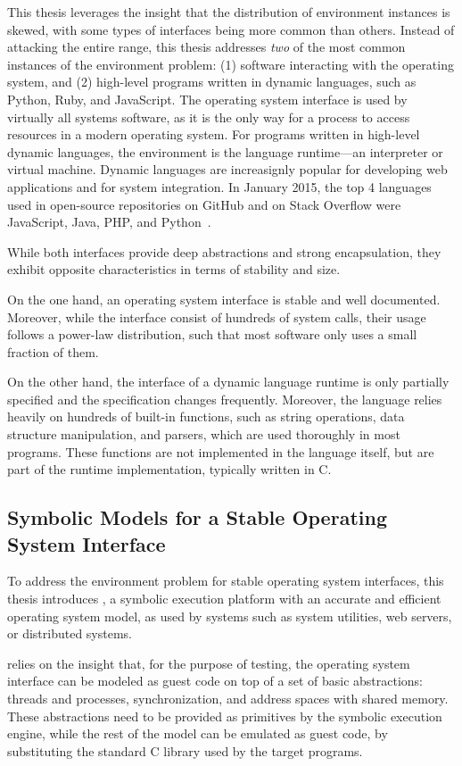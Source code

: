 This thesis leverages the insight that the distribution of environment instances is skewed, with some types of interfaces being more common than others.
%
Instead of attacking the entire range, this thesis addresses \emph{two} of the most common instances of the environment problem:  (1) software interacting with the operating system, and (2) high-level programs written in dynamic languages, such as Python, Ruby, and JavaScript.
%
The operating system interface is used by virtually all systems software, as it is the only way for a process to access resources in a modern operating system.
%
For programs written in high-level dynamic languages, the environment is the language runtime---an interpreter or virtual machine.  Dynamic languages are increasignly popular for developing web applications and for system integration.  In January 2015, the top 4 languages used in open-source repositories on GitHub and on Stack Overflow were JavaScript, Java, PHP, and Python~\cite{lang-stats-2015}.

While both interfaces provide deep abstractions and strong encapsulation, they exhibit opposite characteristics in terms of stability and size.

On the one hand, an operating system interface is stable and well documented.
%
Moreover, while the interface consist of hundreds of system calls, their usage follows a power-law distribution, such that most software only uses a small fraction of them.

On the other hand, the interface of a dynamic language runtime is only partially specified and the specification changes frequently.
%
Moreover, the language relies heavily on hundreds of built-in functions, such as string operations, data structure manipulation, and parsers, which are used thoroughly in most programs.
%
These functions are not implemented in the language itself, but are part of the runtime implementation, typically written in C.


\subsection{Symbolic Models for a Stable Operating System Interface}

To address the environment problem for stable operating system interfaces, this thesis introduces \cnine, a symbolic execution platform with an accurate and efficient operating system model, as used by systems such as system utilities, web servers, or distributed systems.

\cnine relies on the insight that, for the purpose of testing, the operating system interface can be modeled as guest code on top of a set of basic abstractions: threads and processes, synchronization, and address spaces with shared memory.
%
These abstractions need to be provided as primitives by the symbolic execution engine, while the rest of the model can be emulated as guest code, by substituting the standard C library used by the target programs.

